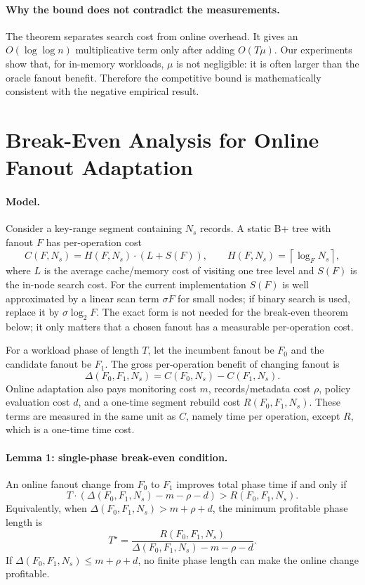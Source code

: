 \paragraph{Why the bound does not contradict the measurements.}
The theorem separates search cost from online overhead.  It gives an
$O(\log\log n)$ multiplicative term only after adding $O(T\mu)$.  Our
experiments show that, for in-memory workloads, $\mu$ is not negligible: it is
often larger than the oracle fanout benefit.  Therefore the competitive bound
is mathematically consistent with the negative empirical result.

\section{Break-Even Analysis for Online Fanout Adaptation}
\label{sec:math-break-even}

\paragraph{Model.}
Consider a key-range segment containing $N_s$ records.  A static B+ tree with
fanout $F$ has per-operation cost
\[
  C(F,N_s) = H(F,N_s)\cdot(L + S(F)),
  \qquad
  H(F,N_s)=\left\lceil \log_F N_s \right\rceil ,
\]
where $L$ is the average cache/memory cost of visiting one tree level and
$S(F)$ is the in-node search cost.  For the current implementation $S(F)$ is
well approximated by a linear scan term $\sigma F$ for small nodes; if binary
search is used, replace it by $\sigma \log_2 F$.  The exact form is not needed
for the break-even theorem below; it only matters that a chosen fanout has a
measurable per-operation cost.

For a workload phase of length $T$, let the incumbent fanout be $F_0$ and the
candidate fanout be $F_1$.  The gross per-operation benefit of changing fanout is
\[
  \Delta(F_0,F_1,N_s) = C(F_0,N_s)-C(F_1,N_s).
\]
Online adaptation also pays monitoring cost $m$, records/metadata cost $\rho$,
policy evaluation cost $d$, and a one-time segment rebuild cost
$R(F_0,F_1,N_s)$.  These terms are measured in the same unit as $C$, namely
time per operation, except $R$, which is a one-time time cost.

\paragraph{Lemma 1: single-phase break-even condition.}
An online fanout change from $F_0$ to $F_1$ improves total phase time if and
only if
\[
  T\cdot\left(\Delta(F_0,F_1,N_s)-m-\rho-d\right)
  > R(F_0,F_1,N_s).
\]
Equivalently, when $\Delta(F_0,F_1,N_s)>m+\rho+d$, the minimum profitable phase
length is
\[
  T^\star =
  \frac{R(F_0,F_1,N_s)}
       {\Delta(F_0,F_1,N_s)-m-\rho-d}.
\]
If $\Delta(F_0,F_1,N_s)\le m+\rho+d$, no finite phase length can make the
online change profitable.

